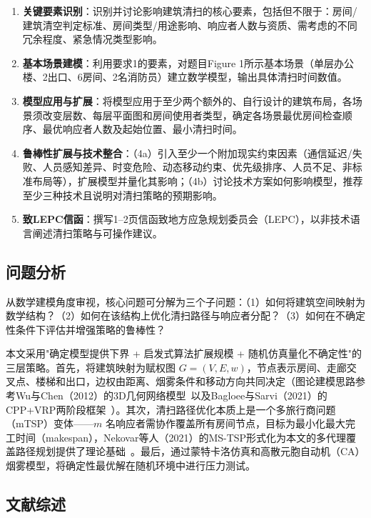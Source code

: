 \documentclass[12pt,a4paper]{ctexart}
\begin{document}
\begin{enumerate}[label=\textbf{要求 \arabic*:}, leftmargin=*]
    \item \textbf{关键要素识别}：识别并讨论影响建筑清扫的核心要素，包括但不限于：房间\slash 建筑清空判定标准、房间类型\slash 用途影响、响应者人数与资质、需考虑的不同冗余程度、紧急情况类型影响。
    \item \textbf{基本场景建模}：利用要求1的要素，对题目Figure 1所示基本场景（单层办公楼、2出口、6房间、2名消防员）建立数学模型，输出具体清扫时间数值。
    \item \textbf{模型应用与扩展}：将模型应用于至少两个额外的、自行设计的建筑布局，各场景须改变层数、每层平面图和房间使用者类型，确定各场景最优房间检查顺序、最优响应者人数及起始位置、最小清扫时间。
    \item \textbf{鲁棒性扩展与技术整合}：（4a）引入至少一个附加现实约束因素（通信延迟\slash 失败、人员感知差异、时变危险、动态移动约束、优先级排序、人员不足、非标准布局等），扩展模型并量化其影响；（4b）讨论技术方案如何影响模型，推荐至少三种技术且说明对清扫策略的预期影响。
    \item \textbf{致LEPC信函}：撰写1--2页信函致地方应急规划委员会（LEPC），以非技术语言阐述清扫策略与可操作建议。
\end{enumerate}

\subsection{问题分析}

从数学建模角度审视，核心问题可分解为三个子问题：（1）如何将建筑空间映射为数学结构？（2）如何在该结构上优化清扫路径与响应者分配？（3）如何在不确定性条件下评估并增强策略的鲁棒性？

本文采用"确定模型提供下界 + 启发式算法扩展规模 + 随机仿真量化不确定性"的三层策略。首先，将建筑映射为赋权图 $G=(V,E,w)$，节点表示房间、走廊交叉点、楼梯和出口，边权由距离、烟雾条件和移动方向共同决定（图论建模思路参考Wu与Chen（2012）的3D几何网络模型~\cite{wu2012threedimensional}以及Bagloee与Sarvi（2021）的CPP+VRP两阶段框架~\cite{bagloee2021emergency}）。其次，清扫路径优化本质上是一个多旅行商问题（mTSP）变体——$m$ 名响应者需协作覆盖所有房间节点，目标为最小化最大完工时间（makespan），Nekovar等人（2021）的MS-TSP形式化为本文的多代理覆盖路径规划提供了理论基础~\cite{nekovar2021multitour}。最后，通过蒙特卡洛仿真和高散元胞自动机（CA）烟雾模型，将确定性最优解在随机环境中进行压力测试。

\subsection{文献综述}
\end{document}
